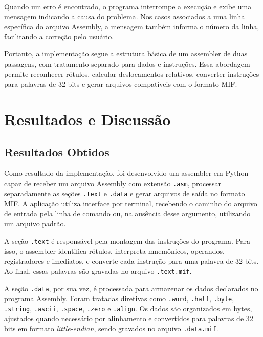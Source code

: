 \documentclass[conference]{IEEEtran}
\begin{document}
Quando um erro é encontrado, o programa interrompe a execução e exibe uma mensagem indicando a causa do problema. Nos casos associados a uma linha específica do arquivo Assembly, a mensagem também informa o número da linha, facilitando a correção pelo usuário.

Portanto, a implementação segue a estrutura básica de um assembler de duas passagens, com tratamento separado para dados e instruções. Essa abordagem permite reconhecer rótulos, calcular deslocamentos relativos, converter instruções para palavras de 32 bits e gerar arquivos compatíveis com o formato MIF.

\section{Resultados e Discussão}

\subsection{Resultados Obtidos}

Como resultado da implementação, foi desenvolvido um assembler em Python capaz de receber um arquivo Assembly com extensão \texttt{.asm}, processar separadamente as seções \texttt{.text} e \texttt{.data} e gerar arquivos de saída no formato MIF. A aplicação utiliza interface por terminal, recebendo o caminho do arquivo de entrada pela linha de comando ou, na ausência desse argumento, utilizando um arquivo padrão.

A seção \texttt{.text} é responsável pela montagem das instruções do programa. Para isso, o assembler identifica rótulos, interpreta mnemônicos, operandos, registradores e imediatos, e converte cada instrução para uma palavra de 32 bits. Ao final, essas palavras são gravadas no arquivo \texttt{.text.mif}.

A seção \texttt{.data}, por sua vez, é processada para armazenar os dados declarados no programa Assembly. Foram tratadas diretivas como \texttt{.word}, \texttt{.half}, \texttt{.byte}, \texttt{.string}, \texttt{.ascii}, \texttt{.space}, \texttt{.zero} e \texttt{.align}. Os dados são organizados em bytes, ajustados quando necessário por alinhamento e convertidos para palavras de 32 bits em formato \textit{little-endian}, sendo gravados no arquivo \texttt{.data.mif}.
\end{document}
